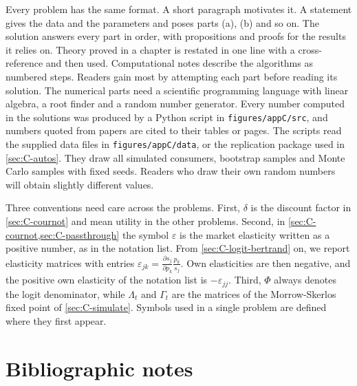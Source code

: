 Every problem has the same format. A short paragraph motivates it. A statement gives the data and the parameters
and poses parts (a), (b) and so on. The solution answers every part in order, with propositions and proofs for the
results it relies on. Theory proved in a chapter is restated in one line with a cross-reference and then used.
Computational notes describe the algorithms as numbered steps. Readers gain most by attempting each part before
reading its solution. The numerical parts need a scientific programming language with linear algebra, a root
finder and a random number generator. Every number computed in the solutions was produced by a Python script in
\texttt{figures/appC/src}, and numbers quoted from papers are cited to their tables or pages. The scripts read the
supplied data files in \texttt{figures/appC/data}, or the replication package used in \cref{sec:C-autos}. They draw
all simulated consumers, bootstrap samples and Monte Carlo samples with fixed seeds. Readers who draw their own random
numbers will obtain slightly different values.

Three conventions need care across the problems. First, $\delta$ is the discount factor in \cref{sec:C-cournot}
and mean utility in the other problems. Second, in \cref{sec:C-cournot,sec:C-passthrough} the symbol $\varepsilon$
is the market elasticity written as a positive number, as in the notation list. From \cref{sec:C-logit-bertrand}
on, we report elasticity matrices with entries $\varepsilon_{jk} = \frac{\partial s_j}{\partial p_k}\frac{p_k}{s_j}$.
Own elasticities are then negative, and the positive own elasticity of the notation list is $-\varepsilon_{jj}$.
Third, $\Phi$ always denotes the logit denominator, while $\Lambda_t$ and $\Gamma_t$ are the matrices of the
Morrow-Skerlos fixed point of \cref{sec:C-simulate}. Symbols used in a single problem are defined where they first
appear.






\section{Bibliographic notes}\label{sec:C-notes}

